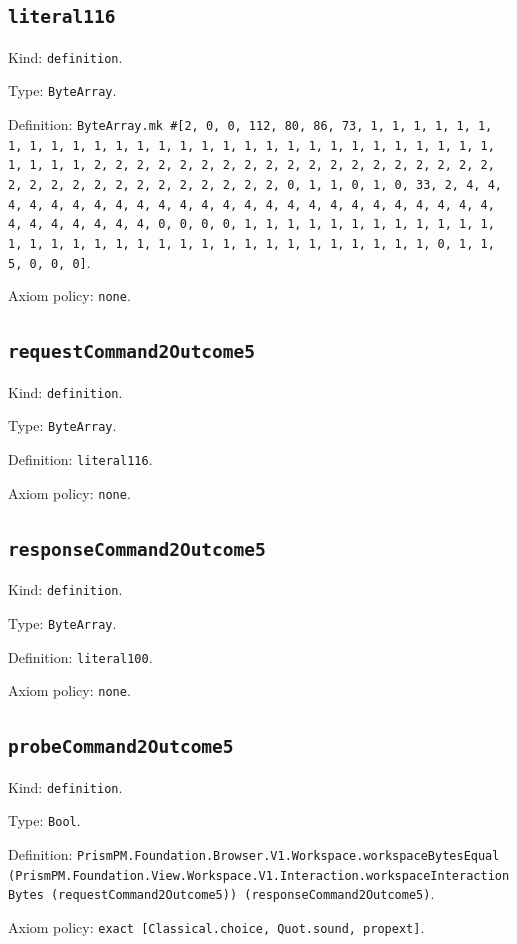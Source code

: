 \documentclass[11pt]{article}
\begin{document}
\subsection*{\texttt{literal116}}
\noindent Kind: \texttt{definition}.\par
\noindent Type: \texttt{ByteArray}.\par
\noindent Definition: \texttt{ByteArray.mk \#[2, 0, 0, 112, 80, 86, 73, 1, 1, 1, 1, 1, 1, 1, 1, 1, 1, 1, 1, 1, 1, 1, 1, 1, 1, 1, 1, 1, 1, 1, 1, 1, 1, 1, 1, 1, 1, 1, 1, 1, 2, 2, 2, 2, 2, 2, 2, 2, 2, 2, 2, 2, 2, 2, 2, 2, 2, 2, 2, 2, 2, 2, 2, 2, 2, 2, 2, 2, 2, 2, 2, 2, 0, 1, 1, 0, 1, 0, 33, 2, 4, 4, 4, 4, 4, 4, 4, 4, 4, 4, 4, 4, 4, 4, 4, 4, 4, 4, 4, 4, 4, 4, 4, 4, 4, 4, 4, 4, 4, 4, 4, 4, 0, 0, 0, 0, 1, 1, 1, 1, 1, 1, 1, 1, 1, 1, 1, 1, 1, 1, 1, 1, 1, 1, 1, 1, 1, 1, 1, 1, 1, 1, 1, 1, 1, 1, 1, 1, 0, 1, 1, 5, 0, 0, 0]}.\par
\noindent Axiom policy: \texttt{none}.\par
\subsection*{\texttt{requestCommand2Outcome5}}
\noindent Kind: \texttt{definition}.\par
\noindent Type: \texttt{ByteArray}.\par
\noindent Definition: \texttt{literal116}.\par
\noindent Axiom policy: \texttt{none}.\par
\subsection*{\texttt{responseCommand2Outcome5}}
\noindent Kind: \texttt{definition}.\par
\noindent Type: \texttt{ByteArray}.\par
\noindent Definition: \texttt{literal100}.\par
\noindent Axiom policy: \texttt{none}.\par
\subsection*{\texttt{probeCommand2Outcome5}}
\noindent Kind: \texttt{definition}.\par
\noindent Type: \texttt{Bool}.\par
\noindent Definition: \texttt{PrismPM.Foundation.Browser.V1.Workspace.workspaceBytesEqual (PrismPM.Foundation.View.Workspace.V1.Interaction.workspaceInteractionBytes (requestCommand2Outcome5)) (responseCommand2Outcome5)}.\par
\noindent Axiom policy: \texttt{exact [Classical.choice, Quot.sound, propext]}.\par
\end{document}
